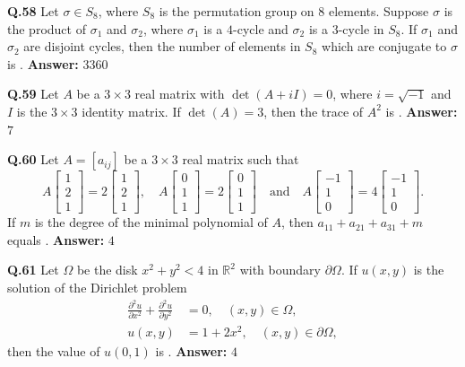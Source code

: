 \documentclass[11pt,a4paper]{article}
\newcommand{\ans}[1]{\textbf{Answer:} #1\par\medskip}
\begin{document}
\textbf{Q.58} Let $\sigma \in S_8$, where $S_8$ is the permutation group on $8$ elements. Suppose $\sigma$ is the product of $\sigma_1$ and $\sigma_2$, where $\sigma_1$ is a $4$-cycle and $\sigma_2$ is a $3$-cycle in $S_8$. If $\sigma_1$ and $\sigma_2$ are disjoint cycles, then the number of elements in $S_8$ which are conjugate to $\sigma$ is \underline{\hspace{2cm}}.
\ans{$3360$}

\textbf{Q.59} Let $A$ be a $3 \times 3$ real matrix with $\det(A + iI) = 0$, where $i = \sqrt{-1}$ and $I$ is the $3 \times 3$ identity matrix. If $\det(A) = 3$, then the trace of $A^2$ is \underline{\hspace{2cm}}.
\ans{$7$}

\textbf{Q.60} Let $A = [a_{ij}]$ be a $3 \times 3$ real matrix such that
\[
  A\begin{bmatrix} 1 \\ 2 \\ 1 \end{bmatrix} = 2\begin{bmatrix} 1 \\ 2 \\ 1 \end{bmatrix}, \quad
  A\begin{bmatrix} 0 \\ 1 \\ 1 \end{bmatrix} = 2\begin{bmatrix} 0 \\ 1 \\ 1 \end{bmatrix} \quad \text{and} \quad
  A\begin{bmatrix} -1 \\ 1 \\ 0 \end{bmatrix} = 4\begin{bmatrix} -1 \\ 1 \\ 0 \end{bmatrix}.
\]
If $m$ is the degree of the minimal polynomial of $A$, then $a_{11} + a_{21} + a_{31} + m$ equals \underline{\hspace{2cm}}.
\ans{$4$}

\textbf{Q.61} Let $\Omega$ be the disk $x^2 + y^2 < 4$ in $\mathbb{R}^2$ with boundary $\partial\Omega$. If $u(x, y)$ is the solution of the Dirichlet problem
\begin{align*}
  \frac{\partial^2 u}{\partial x^2} + \frac{\partial^2 u}{\partial y^2} &= 0, \quad (x, y) \in \Omega, \\
  u(x, y) &= 1 + 2x^2, \quad (x, y) \in \partial\Omega,
\end{align*}
then the value of $u(0, 1)$ is \underline{\hspace{2cm}}.
\ans{$4$}
\end{document}

